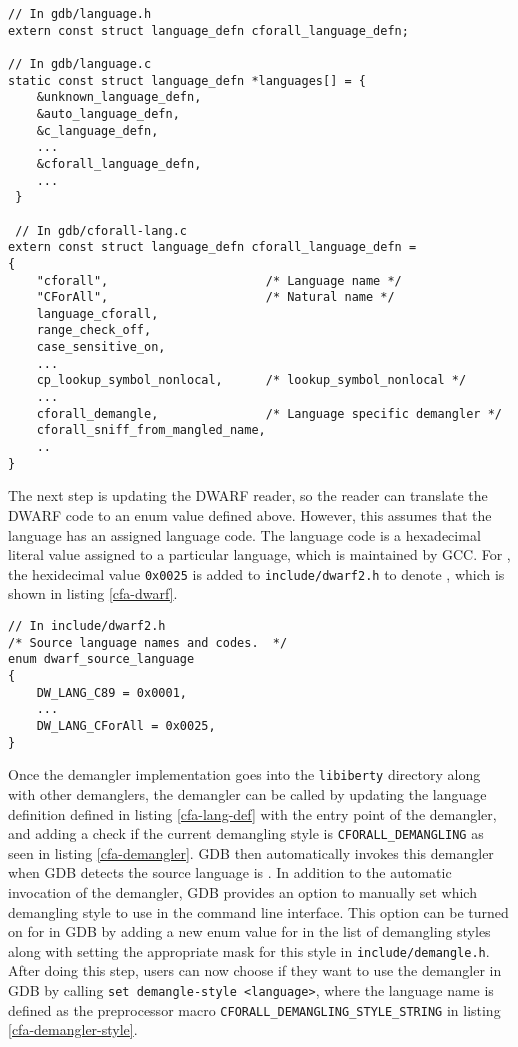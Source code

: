 \begin{lstlisting}[style=C++, caption={Language definition declaration for
\CFA}, label={cfa-lang-def}, basicstyle=\small]
// In gdb/language.h
extern const struct language_defn cforall_language_defn;

// In gdb/language.c
static const struct language_defn *languages[] = {
    &unknown_language_defn,
    &auto_language_defn,
    &c_language_defn,
    ...
    &cforall_language_defn,
    ...
 }

 // In gdb/cforall-lang.c
extern const struct language_defn cforall_language_defn =
{
    "cforall",                      /* Language name */
    "CForAll",                      /* Natural name */
    language_cforall,
    range_check_off,
    case_sensitive_on,
    ...
    cp_lookup_symbol_nonlocal,      /* lookup_symbol_nonlocal */
    ...
    cforall_demangle,               /* Language specific demangler */
    cforall_sniff_from_mangled_name,
    ..
}
\end{lstlisting}

The next step is updating the DWARF reader, so the reader can translate the DWARF code to an enum value defined
above. However, this assumes that the language has an assigned language code.
The language code is a hexadecimal literal value assigned to a particular
language, which is maintained by GCC. For \CFA, the hexidecimal value
\verb|0x0025| is added to \verb|include/dwarf2.h| to denote \CFA, which is shown
in listing \ref{cfa-dwarf}.

\begin{lstlisting}[style=C++, caption={DWARF language code for \CFA},
label={cfa-dwarf}, basicstyle=\small]
// In include/dwarf2.h
/* Source language names and codes.  */
enum dwarf_source_language
{
    DW_LANG_C89 = 0x0001,
    ...
    DW_LANG_CForAll = 0x0025,
}
\end{lstlisting}

Once the demangler implementation goes into the \verb|libiberty| directory along with
other demanglers, the demangler can be called by updating the language
definition defined in listing \ref{cfa-lang-def} with the entry point of the
\CFAS demangler, and adding a check if the current demangling style is
\verb|CFORALL_DEMANGLING| as seen in listing \ref{cfa-demangler}. GDB then
automatically invokes this \CFAS demangler
when GDB detects the source language is \CFA. In addition to the automatic
invocation of the demangler, GDB provides an option
to manually set which demangling style to use in the command line interface.
This option can be turned on for \CFAS in GDB by adding a new enum value for \CFAS in
the list of demangling styles along with setting the appropriate mask for this
style in \verb|include/demangle.h|. After doing this step, users can now choose
if they want to use the \CFAS demangler in GDB by calling \verb|set demangle-style <language>|, where the language name is defined as the
preprocessor macro \verb|CFORALL_DEMANGLING_STYLE_STRING| in listing
\ref{cfa-demangler-style}.

